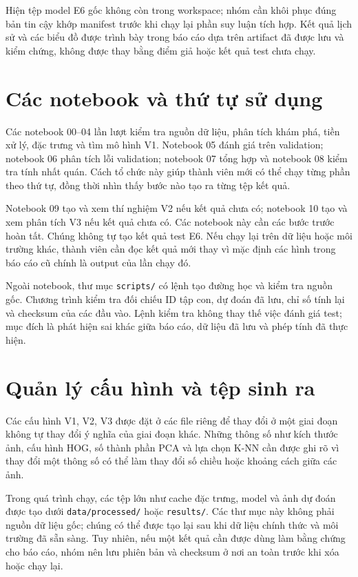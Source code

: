 Hiện tệp model E6 gốc không còn trong workspace; nhóm cần khôi phục đúng bản tin cậy khớp manifest trước khi chạy lại phần suy luận tích hợp. Kết quả lịch sử và các biểu đồ được trình bày trong báo cáo dựa trên artifact đã được lưu và kiểm chứng, không được thay bằng điểm giả hoặc kết quả test chưa chạy.
\section{Các notebook và thứ tự sử dụng}
Các notebook 00–04 lần lượt kiểm tra nguồn dữ liệu, phân tích khám phá, tiền xử lý, đặc trưng và tìm mô hình V1. Notebook 05 đánh giá trên validation; notebook 06 phân tích lỗi validation; notebook 07 tổng hợp và notebook 08 kiểm tra tính nhất quán. Cách tổ chức này giúp thành viên mới có thể chạy từng phần theo thứ tự, đồng thời nhìn thấy bước nào tạo ra từng tệp kết quả.

Notebook 09 tạo và xem thí nghiệm V2 nếu kết quả chưa có; notebook 10 tạo và xem phân tích V3 nếu kết quả chưa có. Các notebook này cần các bước trước hoàn tất. Chúng không tự tạo kết quả test E6. Nếu chạy lại trên dữ liệu hoặc môi trường khác, thành viên cần đọc kết quả mới thay vì mặc định các hình trong báo cáo cũ chính là output của lần chạy đó.

Ngoài notebook, thư mục \texttt{scripts/} có lệnh tạo đường học và kiểm tra nguồn gốc. Chương trình kiểm tra đối chiếu ID tập con, dự đoán đã lưu, chỉ số tính lại và checksum của các đầu vào. Lệnh kiểm tra không thay thế việc đánh giá test; mục đích là phát hiện sai khác giữa báo cáo, dữ liệu đã lưu và phép tính đã thực hiện.
\section{Quản lý cấu hình và tệp sinh ra}
Các cấu hình V1, V2, V3 được đặt ở các file riêng để thay đổi ở một giai đoạn không tự thay đổi ý nghĩa của giai đoạn khác. Những thông số như kích thước ảnh, cấu hình HOG, số thành phần PCA và lựa chọn K-NN cần được ghi rõ vì thay đổi một thông số có thể làm thay đổi số chiều hoặc khoảng cách giữa các ảnh.

Trong quá trình chạy, các tệp lớn như cache đặc trưng, model và ảnh dự đoán được tạo dưới \texttt{data/processed/} hoặc \texttt{results/}. Các thư mục này không phải nguồn dữ liệu gốc; chúng có thể được tạo lại sau khi dữ liệu chính thức và môi trường đã sẵn sàng. Tuy nhiên, nếu một kết quả cần được dùng làm bằng chứng cho báo cáo, nhóm nên lưu phiên bản và checksum ở nơi an toàn trước khi xóa hoặc chạy lại.

